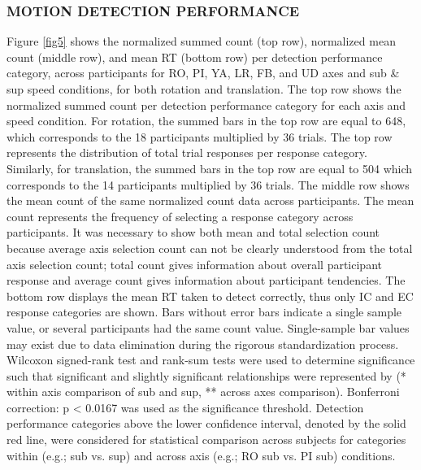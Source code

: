 \documentclass{ieeeaccess}
\begin{document}
\subsubsection{MOTION DETECTION PERFORMANCE}
Figure \ref{fig5} shows the normalized summed count (top row), normalized mean count (middle row), and mean RT (bottom row) per detection performance category, across participants for RO, PI, YA, LR, FB, and UD axes and sub \& sup speed conditions, for both rotation and translation. The top row shows the normalized summed count per detection performance category for each axis and speed condition. For rotation, the summed bars in the top row are equal to 648, which corresponds to the 18 participants multiplied by 36 trials. The top row represents the distribution of total trial responses per response category. Similarly, for translation, the summed bars in the top row are equal to 504 which corresponds to the 14 participants multiplied by 36 trials. The middle row shows the mean count of the same normalized count data across participants. The mean count represents the frequency of selecting a response category across participants. It was necessary to show both mean and total selection count because average axis selection count can not be clearly understood from the total axis selection count; total count gives information about overall participant response and average count gives information about participant tendencies. The bottom row displays the mean RT taken to detect correctly, thus only IC and EC response categories are shown. Bars without error bars indicate a single sample value, or several participants had the same count value. Single-sample bar values may exist due to data elimination during the rigorous standardization process. Wilcoxon signed-rank test and rank-sum tests were used to determine significance such that significant and slightly significant relationships were represented by (* within axis comparison of sub and sup, ** across axes comparison). Bonferroni correction: p < 0.0167 was used as the significance threshold. Detection performance categories above the lower confidence interval, denoted by the solid red line, were considered for statistical comparison across subjects for categories within (e.g.; sub vs. sup) and across axis (e.g.; RO sub vs. PI sub) conditions.
\end{document}
